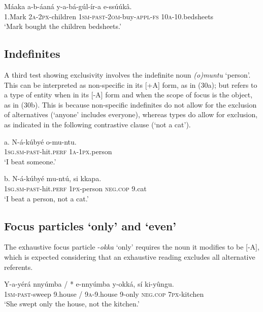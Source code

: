 \documentclass[output=paper]{langsci/langscibook}
\begin{document}
\ea
\gll   Máaka  a-b-áaná    y-a-bá-gúl-ír-a      e-ssúúkâ.\\
       1.Mark  \textsc{2a}-\textsc{2px}-children  \textsc{1sm}-\textsc{past}-\textsc{2om}-buy-\textsc{appl}-\textsc{fs}  \textsc{10a}-10.bedsheets\\
\glt   ‘Mark bought the children bedsheets.’
\z

\subsection{Indefinites} %

A third test showing exclusivity involves the indefinite noun \textit{(o)muntu} ‘person’. This can be interpreted as non-specific in its [+A] form, as in (30a); but refers to a type of entity when in its [-A] form and when the scope of focus is the object, as in (30b). This is because non-specific indefinites do not allow for the exclusion of alternatives (‘anyone’ includes everyone), whereas types do allow for exclusion, as indicated in the following contrastive clause (‘not a cat’).

\ea
\gll   a.  N-á-kúbyé      o-mu-ntu.\\
         \textsc{1sg}.\textsc{sm}-\textsc{past}-hit.\textsc{perf}  \textsc{1a}-\textsc{1px}.person\\
\glt     ‘I beat someone.’
\z

\ea
\gll   b.  N-á-kúbyé      mu-ntú,  si    kkapa.\\
         \textsc{1sg}.\textsc{sm}-\textsc{past}-hit.\textsc{perf}  \textsc{1px}-person  \textsc{neg.cop}  9.cat\\
\glt     ‘I beat a person, not a cat.’
\z

\subsection{Focus particles ‘only’ and ‘even’} %

The exhaustive focus particle -\textit{okka} ‘only’ requires the noun it modifies to be [-A], which is expected considering that an exhaustive reading excludes all alternative referents.

\ea
\gll   Y-a-yérá    nnyúmba /  * e-nnyúmba  y-okká,  sí    ki-yûngu.\\
       \textsc{1sm}-\textsc{past}-sweep  9.house /  \textsc{9a}-9.house  9-only\textsc{  neg}.\textsc{cop}  \textsc{7px}-kitchen\\
\glt ‘She swept only the house, not the kitchen.’
\z
\end{document}
